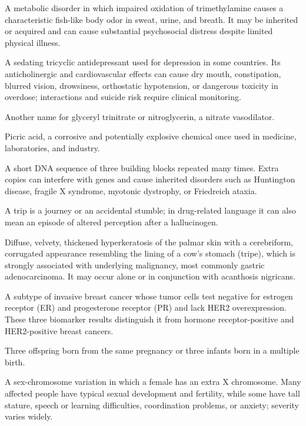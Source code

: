  A metabolic disorder in which impaired oxidation of trimethylamine causes a
characteristic fish-like body odor in sweat, urine, and breath. It may be inherited or
acquired and can cause substantial psychosocial distress despite limited physical
illness.

 A sedating tricyclic antidepressant used for depression in some countries. Its anticholinergic and cardiovascular effects can cause dry mouth, constipation, blurred vision, drowsiness, orthostatic hypotension, or dangerous toxicity in overdose; interactions and suicide risk require clinical monitoring.

 Another name for glyceryl trinitrate or nitroglycerin, a nitrate vasodilator.

 Picric acid, a corrosive and potentially explosive chemical once used in medicine, laboratories, and industry.

 A short DNA sequence of three building blocks repeated many times. Extra copies can interfere with genes and cause inherited disorders such as Huntington disease, fragile X syndrome, myotonic dystrophy, or Friedreich ataxia.

 A trip is a journey or an accidental stumble; in drug-related language it can also mean an episode of altered perception after a hallucinogen.

 Diffuse, velvety, thickened hyperkeratosis of the palmar skin with a cerebriform,
corrugated appearance resembling the lining of a cow's stomach (tripe), which is
strongly associated with underlying malignancy, most commonly gastric adenocarcinoma. It
may occur alone or in conjunction with acanthosis nigricans.

 A subtype of invasive breast cancer whose tumor cells test negative for estrogen receptor (ER) and progesterone receptor (PR) and lack HER2 overexpression. These three biomarker results distinguish it from hormone receptor-positive and HER2-positive breast cancers.

 Three offspring born from the same pregnancy or three infants born in a multiple birth.

 A sex-chromosome variation in which a female has an extra X chromosome. Many affected people have typical sexual development and fertility, while some have tall stature, speech or learning difficulties, coordination problems, or anxiety; severity varies widely.


